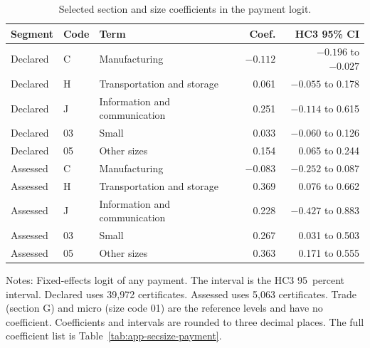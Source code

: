 \begin{table}[H]
\centering
\caption{Selected section and size coefficients in the payment logit.}\label{tab:secsize-payment}
\footnotesize
\begin{tabular}{@{}llp{3.6cm}rr@{}}
\toprule
Segment & Code & Term & Coef. & HC3 95\% CI \\
\midrule
Declared & C & Manufacturing & $-0.112$ & $-0.196$ to $-0.027$ \\
Declared & H & Transportation and storage & 0.061 & $-0.055$ to 0.178 \\
Declared & J & Information and communication & 0.251 & $-0.114$ to 0.615 \\
Declared & 03 & Small & 0.033 & $-0.060$ to 0.126 \\
Declared & 05 & Other sizes & 0.154 & 0.065 to 0.244 \\
Assessed & C & Manufacturing & $-0.083$ & $-0.252$ to 0.087 \\
Assessed & H & Transportation and storage & 0.369 & 0.076 to 0.662 \\
Assessed & J & Information and communication & 0.228 & $-0.427$ to 0.883 \\
Assessed & 03 & Small & 0.267 & 0.031 to 0.503 \\
Assessed & 05 & Other sizes & 0.363 & 0.171 to 0.555 \\
\bottomrule
\end{tabular}

\vspace{0.4em}
\begin{minipage}{0.95\textwidth}
\footnotesize
Notes: Fixed-effects logit of any payment. The interval is the HC3 95~percent interval. Declared uses 39,972 certificates. Assessed uses 5,063 certificates. Trade (section G) and micro (size code 01) are the reference levels and have no coefficient. Coefficients and intervals are rounded to three decimal places. The full coefficient list is Table~\ref{tab:app-secsize-payment}.
\end{minipage}
\end{table}
